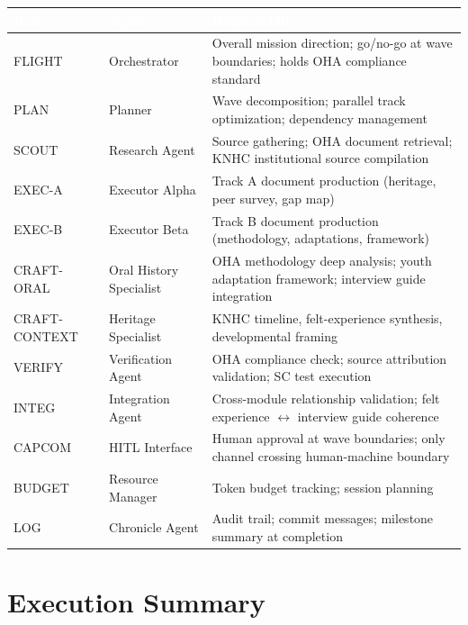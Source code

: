 \documentclass[11pt,letterpaper]{article}
\newcommand{\tableheader}[1]{\textbf{\sffamily\textcolor{white}{#1}}}
\begin{document}
\begin{center}
\begin{tabularx}{\textwidth}{L{2cm}L{3cm}X}
\toprule
{}
\tableheader{Role} & \tableheader{Agent} & \tableheader{Responsibility} \\
\midrule
FLIGHT & Orchestrator & Overall mission direction; go/no-go at wave boundaries; holds OHA compliance standard \\
PLAN & Planner & Wave decomposition; parallel track optimization; dependency management \\
SCOUT & Research Agent & Source gathering; OHA document retrieval; KNHC institutional source compilation \\
EXEC-A & Executor Alpha & Track A document production (heritage, peer survey, gap map) \\
EXEC-B & Executor Beta & Track B document production (methodology, adaptations, framework) \\
CRAFT-ORAL & Oral History Specialist & OHA methodology deep analysis; youth adaptation framework; interview guide integration \\
CRAFT-CONTEXT & Heritage Specialist & KNHC timeline, felt-experience synthesis, developmental framing \\
VERIFY & Verification Agent & OHA compliance check; source attribution validation; SC test execution \\
INTEG & Integration Agent & Cross-module relationship validation; felt experience $\leftrightarrow$ interview guide coherence \\
CAPCOM & HITL Interface & Human approval at wave boundaries; only channel crossing human-machine boundary \\
BUDGET & Resource Manager & Token budget tracking; session planning \\
LOG & Chronicle Agent & Audit trail; commit messages; milestone summary at completion \\
\bottomrule
\end{tabularx}
\end{center}

\section{Execution Summary}
\end{document}
